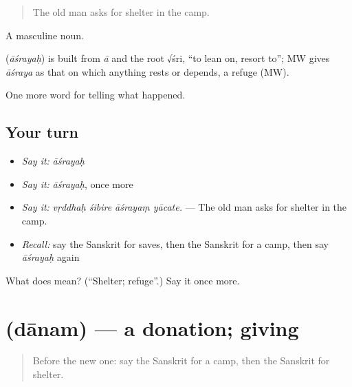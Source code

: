\begin{quote}
The old man asks for shelter in the camp.
\end{quote}

A masculine noun.

\begin{cousinweb}
\textbf{} (\emph{āśrayaḥ}) is built from \emph{ā} and the root √śri, \textquotedblleft{}to lean on, resort to\textquotedblright{}; MW gives \emph{āśraya} as that on which anything rests or depends, a refuge (MW).
\end{cousinweb}

\begin{grammarlens}[title={What you've built}]
One more word for telling what happened.
\end{grammarlens}

\subsection*{Your turn}
\begin{itemize}
\raggedright
  \item \emph{Say it:} \emph{āśrayaḥ}
  \item \emph{Say it:} \emph{āśrayaḥ}, once more
  \item \emph{Say it:} \emph{vṛddhaḥ śibire āśrayaṃ yācate.} — The old man asks for shelter in the camp.
  \item \emph{Recall:} say the Sanskrit for saves, then the Sanskrit for a camp, then say \emph{āśrayaḥ} again
\end{itemize}

\begin{tcolorbox}[breakable,colback=teal!4,colframe=teal!35!black,title={Before you move on}]
What does  mean? (\textquotedblleft{}Shelter; refuge\textquotedblright{}.) Say it once more.
\end{tcolorbox}
\section[\texorpdfstring{\sk{दानम्} (dānam)}{दानम् (dānam)}]{ (dānam) — a donation; giving}

\label{lesson:SA-C306-danam}



\begin{quote}
Before the new one: say the Sanskrit for a camp, then the Sanskrit for shelter.
\end{quote}

